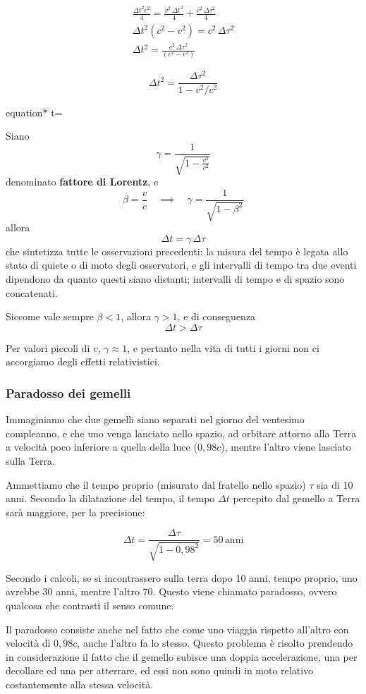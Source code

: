 \documentclass[a4paper, oneside]{article}
\newcommand*\mygraybox[0]{%
		\tcbhighmath}
\newcommand{\equazione}[1]{	\begin{empheq}[box=\mygraybox]{equation*}
			#1
		\end{empheq}}
\newcounter{i}%
\newcounter{n}%
\newcounter{I}%
\begin{document}
\begin{multline*}
\frac{\Delta t^2c^2}{4}=\frac{v^2\,\Delta t^2}{4}+\frac{c^2\,\Delta\tau^2}{4}\\
\Delta t^2(c^2-v^2)=c^2\,\Delta\tau^2\\
\Delta t^2=\frac{c^2\,\Delta\tau^2}{(c^2-v^2)}
\end{multline*}

\[\Delta t^2=\frac{\Delta \tau^2}{1-v^2/c^2}\]

\equazione{\Delta t=}

\noindent Siano
\[\gamma=\frac{1}{\sqrt{1-\frac{v^2}{c^2}}}\]
denominato \textbf{fattore di Lorentz}, e
\[\beta=\frac{v}{c}\quad\implies \quad\gamma=\frac{1}{\sqrt{1-\beta^2}}\]
allora
\[\Delta t =\gamma\,\Delta\tau\]
che sintetizza tutte le osservazioni precedenti: la misura del tempo è legata allo stato di quiete o di moto degli osservatori, e gli intervalli di tempo tra due eventi dipendono da quanto questi siano distanti; intervalli di tempo e di spazio sono concatenati.

Siccome vale sempre $\beta<1$, allora $\gamma>1$, e di conseguenza
\[\Delta t>\Delta \tau\]

Per valori piccoli di $v$, $\gamma\approx1$, e pertanto nella vita di tutti i giorni non ci accorgiamo degli effetti relativistici.

\subsubsection{Paradosso dei gemelli}

Immaginiamo che due gemelli siano separati nel giorno del ventesimo compleanno, e che uno venga lanciato nello spazio, ad orbitare attorno alla Terra a velocità poco inferiore a quella della luce ($0,98c$), mentre l’altro viene lasciato sulla Terra.

Ammettiamo che il tempo proprio (misurato dal fratello nello spazio) $\tau$ sia di 10 anni. Secondo la dilatazione del tempo, il tempo $\Delta t$ percepito dal gemello a Terra sarà maggiore, per la precisione:

\[\Delta t=\frac{\Delta\tau}{\sqrt{1-0,98^2}}=50\,\text{anni}\]

Secondo i calcoli, se si incontrassero sulla terra dopo 10 anni, tempo proprio, uno avrebbe 30 anni, mentre l’altro 70.
Questo viene chiamato paradosso, ovvero qualcosa che contrasti il senso comune.

Il paradosso consiste anche nel fatto che come uno viaggia rispetto all’altro con velocità di $0,98c$, anche l’altro fa lo stesso. Questo problema è risolto prendendo in considerazione il fatto che il gemello subisce una doppia accelerazione, una per decollare ed una per atterrare, ed essi non sono quindi in moto relativo costantemente alla stessa velocità.
\end{document}
